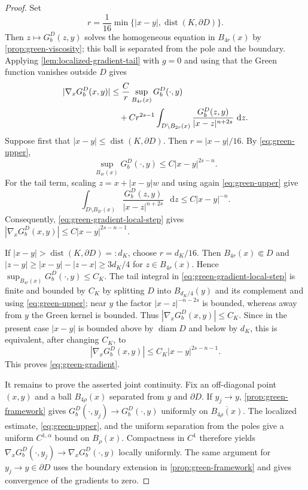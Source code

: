 \documentclass[reqno]{amsart}
\numberwithin{equation}{section}
\theoremstyle{plain}
\theoremstyle{definition}
\theoremstyle{remark}
\newcommand{\differential}{\mathop{}\!\mathrm d}
\newcommand{\rev}[1]{#1}
\begin{document}
\begin{proof}
\rev{Set
\[
 r=\frac1{16}\min\{|x-y|,\operatorname{dist}(K,\partial D)\}.
\]
Then $z\mapsto G_b^D(z,y)$ solves the homogeneous equation in
$B_{4r}(x)$ by \cref{prop:green-viscosity}; this ball is separated from
the pole and the boundary.}  Applying \cref{lem:localized-gradient-tail} with $g=0$ and
using that the Green function vanishes outside $D$ gives
\begin{align}\label{eq:green-gradient-local-step}
 |\nabla_xG_b^D(x,y)|
 &\le \frac{C}{r}\sup_{B_{4r}(x)}G_b^D(\cdot,y)\notag\\
 &\quad+C r^{2s-1}
 \int_{D\setminus B_{2r}(x)}
 \frac{G_b^D(z,y)}{|x-z|^{n+2s}}\,\differential z.
\end{align}
Suppose first that $|x-y|\le\operatorname{dist}(K,\partial D)$.  Then
\rev{$r=|x-y|/16$}.  By \eqref{eq:green-upper},
\[
 \sup_{B_{4r}(x)}G_b^D(\cdot,y)\le C|x-y|^{2s-n}.
\]
For the tail term, scaling $z=x+|x-y|w$ and using again
\eqref{eq:green-upper} give
\[
 \int_{D\setminus B_{2r}(x)}
 \frac{G_b^D(z,y)}{|x-z|^{n+2s}}\,\differential z
 \le C|x-y|^{-n}.
\]
Consequently, \eqref{eq:green-gradient-local-step} gives
$|\nabla_xG_b^D(x,y)|\le C|x-y|^{2s-n-1}$.

If $|x-y|>\operatorname{dist}(K,\partial D)=:d_K$, choose
\rev{$r=d_K/16$}.  \rev{Then $B_{4r}(x)\Subset D$ and
$|z-y|\ge |x-y|-|z-x|\ge3d_K/4$ for $z\in B_{4r}(x)$.}  Hence
$\sup_{B_{4r}(x)}G_b^D(\cdot,y)\le C_K$.  The tail integral in
\eqref{eq:green-gradient-local-step} is finite and bounded by $C_K$ by
splitting $D$ into $B_{d_K/4}(y)$ and its complement and using
\eqref{eq:green-upper}; near $y$ the factor $|x-z|^{-n-2s}$ is bounded,
whereas away from $y$ the Green kernel is bounded.  Thus
$|\nabla_xG_b^D(x,y)|\le C_K$.  Since in the present case
$|x-y|$ is bounded above by $\operatorname{diam}D$ and below by $d_K$,
this is equivalent, after changing $C_K$, to
\[
 |\nabla_xG_b^D(x,y)|\le C_K|x-y|^{2s-n-1}.
\]
This proves
\eqref{eq:green-gradient}.

\rev{It remains to prove the asserted joint continuity.  Fix an
off-diagonal point $(x,y)$ and a ball $B_{4\rho}(x)$ separated from $y$ and
$\partial D$.  If $y_j\to y$, \cref{prop:green-framework} gives
$G_b^D(\cdot,y_j)\to G_b^D(\cdot,y)$ uniformly on
$\overline{B_{4\rho}(x)}$.  The localized estimate, \eqref{eq:green-upper},
and the uniform separation from the poles give a uniform
$C^{1,\alpha}$ bound on $B_\rho(x)$.  Compactness in $C^1$ therefore yields
$\nabla_xG_b^D(\cdot,y_j)\to\nabla_xG_b^D(\cdot,y)$ locally uniformly.
The same argument for $y_j\to y\in\partial D$ uses the boundary extension
in \cref{prop:green-framework} and gives convergence of the gradients to
zero.}
\end{proof}
\end{document}
